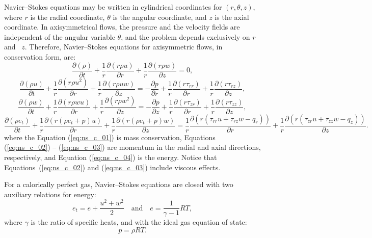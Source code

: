 \documentclass[a4paper,10pt]{article}
\newcommand{\Diff}[2] {\dfrac{\partial( #1)}{\partial #2}}
\newcommand{\diff}[2] {\dfrac{\partial #1}{\partial #2}}
\begin{document}
\begin{landscape}
Navier--Stokes equations may be written in cylindrical coordinates for $(r,\theta,z)$, where $r$ is the radial coordinate, $\theta$ is the angular coordinate, and $z$ is the axial coordinate. In axisymmetrical flows, the pressure and the velocity fields are independent of the angular variable $\theta$, and the problem depends exclusively on $r$ and~ $z$. Therefore, Navier--Stokes equations for axisymmetric flows, in conservation form,  are:
\begin{equation}
 \label{eq:ns_c_01}
\Diff{\rho}{t}+ \dfrac{1}{r} \Diff{r \rho u}{r}+ \dfrac{1}{r}\Diff{r \rho  w}{z}=0,
\end{equation}
\begin{equation}
\label{eq:ns_c_02}
\Diff{\rho u}{t} +\dfrac{1}{r}\Diff{r \rho u^2 }{r}+ \dfrac{1}{r}\Diff{r \rho u w }{z}=-\diff{p}{r}+\dfrac{1}{r}\Diff{r \tau_{rr}}{r}+\dfrac{1}{r}\Diff{r \tau_{rz}}{z},
\end{equation}
\begin{equation}
\label{eq:ns_c_03}
\Diff{\rho w}{t} + \dfrac{1}{r}\Diff{r \rho w u }{r}+ \dfrac{1}{r}\Diff{r \rho w^2 }{z}=-\diff{p}{z}+\dfrac{1}{r}\Diff{r \tau_{zr}}{r}+\dfrac{1}{r}\Diff{r \tau_{zz}}{z},
\end{equation}
\begin{equation}
\label{eq:ns_c_04}
\Diff{\rho e_t}{ t}+\dfrac{1}{r}\Diff{r(\rho e_t+p) u}{ r}+\dfrac{1}{r}\Diff{r(\rho e_t+p)w}{z}
=\dfrac{1}{r}\Diff{r( \tau_{rr} u + \tau_{rz} w -q_r) }{r} + \dfrac{1}{r}\Diff{r( \tau_{zr} u + \tau_{zz} w - q_z) }{z}.
\end{equation}
where the Equation (\ref{eq:ns_c_01}) is mass conservation, Equations (\ref{eq:ns_c_02}) -- (\ref{eq:ns_c_03}) are momentum in the radial and axial directions, respectively, and Equation (\ref{eq:ns_c_04}) is the energy. Notice that Equations~(\ref{eq:ns_c_02}) and (\ref{eq:ns_c_03}) include viscous effects.

For a calorically perfect gas, Navier--Stokes equations are closed with two auxiliary relations for energy:
\begin{equation}
 \label{eq:ns_c_05}
e_t= e+\dfrac{u^2+w^2}{2} \quad \mbox{and}\quad e=\dfrac{1}{\gamma -1}RT ,
\end{equation}
where $\gamma$ is the ratio of specific heats, and with the ideal gas equation of state:
\begin{equation}
 \label{eq:ns_c_07}
p=\rho RT.
\end{equation}



\end{landscape}
\end{document}
